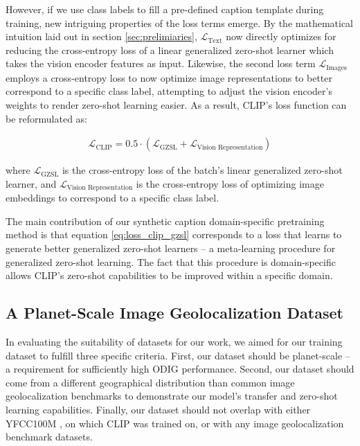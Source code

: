 \documentclass{article}
\renewcommand{\cite}[1]{\citep{#1}}
\begin{document}
However, if we use class labels to fill a pre-defined caption template during training, new intriguing properties of the loss terms emerge. By the mathematical intuition laid out in section \ref{sec:prelimiaries}, $\mathcal{L}_{\text{Text}}$ now directly optimizes for reducing the cross-entropy loss of a linear generalized zero-shot learner which takes the vision encoder features as input. Likewise, the second loss term $\mathcal{L}_{\text{Images}}$ employs a cross-entropy loss to now optimize image representations to better correspond to a specific class label, attempting to adjust the vision encoder's weights to render zero-shot learning easier. As a result, CLIP's loss function can be reformulated as:

\begin{align}
    \mathcal{L}_{\text{CLIP}} = 0.5 \cdot (\mathcal{L}_{\text{GZSL}} + \mathcal{L}_{\text{Vision Representation}})
    \label{eq:loss_clip_gzsl}
\end{align}

where $\mathcal{L}_{\text{GZSL}}$ is the cross-entropy loss of the batch's linear generalized zero-shot learner, and $\mathcal{L}_{\text{Vision Representation}}$ is the cross-entropy loss of optimizing image embeddings to correspond to a specific class label.

The main contribution of our synthetic caption domain-specific pretraining method is that equation \ref{eq:loss_clip_gzsl} corresponds to a loss that learns to generate better generalized zero-shot learners – a meta-learning procedure for generalized zero-shot learning. The fact that this procedure is domain-specific allows CLIP's zero-shot capabilities to be improved within a specific domain.

\subsection{A Planet-Scale Image Geolocalization Dataset}
\label{sec:datasetours}

In evaluating the suitability of datasets for our work, we aimed for our training dataset to fulfill three specific criteria. First, our dataset should be planet-scale – a requirement for sufficiently high ODIG performance. Second, our dataset should come from a different geographical distribution than common image geolocalization benchmarks to demonstrate our model's transfer and zero-shot learning capabilities. Finally, our dataset should not overlap with either YFCC100M \cite{thomee_2016}, on which CLIP \cite{radford21a} was trained on, or with any image geolocalization benchmark datasets.
\end{document}

